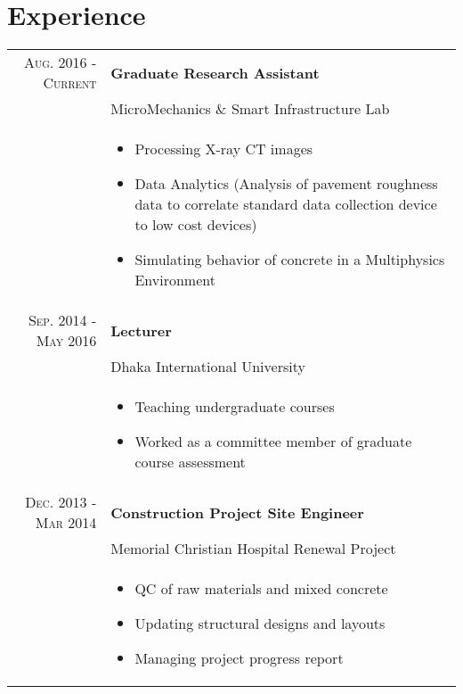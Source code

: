 \documentclass[a4paper,10pt]{article}
\begin{document}
\section{Experience}
\begin{tabular}{rp{11cm}}
 
 \textsc{Aug. 2016 - Current} &\textbf{Graduate Research Assistant}\\
  & MicroMechanics \& Smart Infrastructure Lab\\
 & \begin{itemize}
 \item Processing X-ray CT images
 \item Data Analytics (Analysis of pavement roughness data to correlate standard data collection device to low cost devices)
 \item Simulating behavior of concrete in a Multiphysics Environment
\end{itemize}\\

 
 \textsc{Sep. 2014 - May 2016}&\textbf{Lecturer}\\
   & Dhaka International University\\
  & \begin{itemize}
 \item Teaching undergraduate courses
 \item Worked as a committee member of graduate course assessment
\end{itemize}\\
  
  \textsc{Dec. 2013 - Mar 2014}&\textbf{Construction Project Site Engineer}\\
    & Memorial Christian Hospital Renewal Project\\
  & \begin{itemize}
 \item QC of raw materials and mixed concrete
 \item Updating structural designs and layouts
 \item Managing project progress report
\end{itemize}
 \end{tabular}

\end{document}

